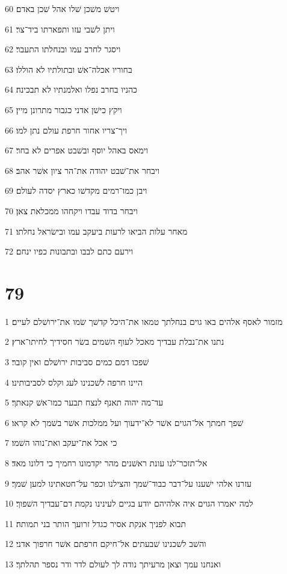 \par 60 ויטשׁ משׁכן שׁלו אהל שׁכן באדם׃
\par 61 ויתן לשׁבי עזו ותפארתו ביד־צר׃
\par 62 ויסגר לחרב עמו ובנחלתו התעבר׃
\par 63 בחוריו אכלה־אשׁ ובתולתיו לא הוללו׃
\par 64 כהניו בחרב נפלו ואלמנתיו לא תבכינה׃
\par 65 ויקץ כישׁן אדני כגבור מתרונן מיין׃
\par 66 ויך־צריו אחור חרפת עולם נתן למו׃
\par 67 וימאס באהל יוסף ובשׁבט אפרים לא בחר׃
\par 68 ויבחר את־שׁבט יהודה את־הר ציון אשׁר אהב׃
\par 69 ויבן כמו־רמים מקדשׁו כארץ יסדה לעולם׃
\par 70 ויבחר בדוד עבדו ויקחהו ממכלאת צאן׃
\par 71 מאחר עלות הביאו לרעות ביעקב עמו ובישׂראל נחלתו׃
\par 72 וירעם כתם לבבו ובתבונות כפיו ינחם׃

\chapter{79}

\par 1 מזמור לאסף אלהים באו גוים בנחלתך טמאו את־היכל קדשׁך שׂמו את־ירושׁלם לעיים׃
\par 2 נתנו את־נבלת עבדיך מאכל לעוף השׁמים בשׂר חסידיך לחיתו־ארץ׃
\par 3 שׁפכו דמם כמים סביבות ירושׁלם ואין קובר׃
\par 4 היינו חרפה לשׁכנינו לעג וקלס לסביבותינו׃
\par 5 עד־מה יהוה תאנף לנצח תבער כמו־אשׁ קנאתך׃
\par 6 שׁפך חמתך אל־הגוים אשׁר לא־ידעוך ועל ממלכות אשׁר בשׁמך לא קראו׃
\par 7 כי אכל את־יעקב ואת־נוהו השׁמו׃
\par 8 אל־תזכר־לנו עונת ראשׁנים מהר יקדמונו רחמיך כי דלונו מאד׃
\par 9 עזרנו אלהי ישׁענו על־דבר כבוד־שׁמך והצילנו וכפר על־חטאתינו למען שׁמך׃
\par 10 למה יאמרו הגוים איה אלהיהם יודע בגיים לעינינו נקמת דם־עבדיך השׁפוך׃
\par 11 תבוא לפניך אנקת אסיר כגדל זרועך הותר בני תמותה׃
\par 12 והשׁב לשׁכנינו שׁבעתים אל־חיקם חרפתם אשׁר חרפוך אדני׃
\par 13 ואנחנו עמך וצאן מרעיתך נודה לך לעולם לדר ודר נספר תהלתך׃

